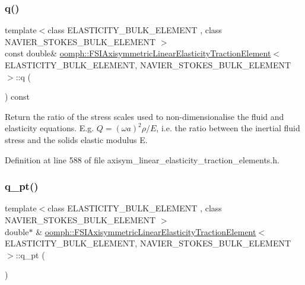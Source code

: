 \subsubsection{\texorpdfstring{q()}{q()}}
{\footnotesize\ttfamily template$<$class E\+L\+A\+S\+T\+I\+C\+I\+T\+Y\+\_\+\+B\+U\+L\+K\+\_\+\+E\+L\+E\+M\+E\+NT , class N\+A\+V\+I\+E\+R\+\_\+\+S\+T\+O\+K\+E\+S\+\_\+\+B\+U\+L\+K\+\_\+\+E\+L\+E\+M\+E\+NT $>$ \\
const double\& \hyperlink{classoomph_1_1FSIAxisymmetricLinearElasticityTractionElement}{oomph\+::\+F\+S\+I\+Axisymmetric\+Linear\+Elasticity\+Traction\+Element}$<$ E\+L\+A\+S\+T\+I\+C\+I\+T\+Y\+\_\+\+B\+U\+L\+K\+\_\+\+E\+L\+E\+M\+E\+NT, N\+A\+V\+I\+E\+R\+\_\+\+S\+T\+O\+K\+E\+S\+\_\+\+B\+U\+L\+K\+\_\+\+E\+L\+E\+M\+E\+NT $>$\+::q (\begin{DoxyParamCaption}{ }\end{DoxyParamCaption}) const\hspace{0.3cm}{\ttfamily [inline]}}



Return the ratio of the stress scales used to non-\/dimensionalise the fluid and elasticity equations. E.\+g. $ Q = (\omega a)^2 \rho/E $, i.\+e. the ratio between the inertial fluid stress and the solid\textquotesingle{}s elastic modulus E. 



Definition at line 588 of file axisym\+\_\+linear\+\_\+elasticity\+\_\+traction\+\_\+elements.\+h.

\mbox{\label{classoomph_1_1FSIAxisymmetricLinearElasticityTractionElement_a21c9405d5cf8a30c974016e289aaa805}} 
\subsubsection{\texorpdfstring{q\+\_\+pt()}{q\_pt()}}
{\footnotesize\ttfamily template$<$class E\+L\+A\+S\+T\+I\+C\+I\+T\+Y\+\_\+\+B\+U\+L\+K\+\_\+\+E\+L\+E\+M\+E\+NT , class N\+A\+V\+I\+E\+R\+\_\+\+S\+T\+O\+K\+E\+S\+\_\+\+B\+U\+L\+K\+\_\+\+E\+L\+E\+M\+E\+NT $>$ \\
double$\ast$ \& \hyperlink{classoomph_1_1FSIAxisymmetricLinearElasticityTractionElement}{oomph\+::\+F\+S\+I\+Axisymmetric\+Linear\+Elasticity\+Traction\+Element}$<$ E\+L\+A\+S\+T\+I\+C\+I\+T\+Y\+\_\+\+B\+U\+L\+K\+\_\+\+E\+L\+E\+M\+E\+NT, N\+A\+V\+I\+E\+R\+\_\+\+S\+T\+O\+K\+E\+S\+\_\+\+B\+U\+L\+K\+\_\+\+E\+L\+E\+M\+E\+NT $>$\+::q\+\_\+pt (\begin{DoxyParamCaption}{ }\end{DoxyParamCaption})\hspace{0.3cm}{\ttfamily [inline]}}



